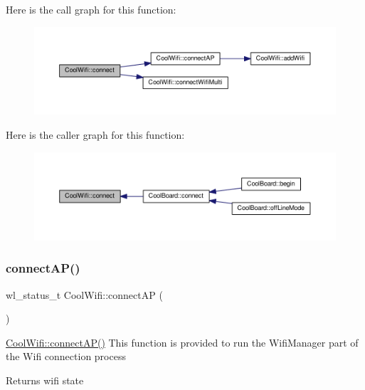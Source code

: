 Here is the call graph for this function\+:
\nopagebreak
\begin{figure}[H]
\begin{center}
\leavevmode
\includegraphics[width=350pt]{classCoolWifi_ad060353050f40d032a2dbf9e54a768bf_cgraph}
\end{center}
\end{figure}
Here is the caller graph for this function\+:
\nopagebreak
\begin{figure}[H]
\begin{center}
\leavevmode
\includegraphics[width=350pt]{classCoolWifi_ad060353050f40d032a2dbf9e54a768bf_icgraph}
\end{center}
\end{figure}
\mbox{\label{classCoolWifi_a7c857f27161782f5ef1d62d552aff971}} 
\subsubsection{\texorpdfstring{connect\+A\+P()}{connectAP()}}
{\footnotesize\ttfamily wl\+\_\+status\+\_\+t Cool\+Wifi\+::connect\+AP (\begin{DoxyParamCaption}{ }\end{DoxyParamCaption})}

\hyperlink{classCoolWifi_a7c857f27161782f5ef1d62d552aff971}{Cool\+Wifi\+::connect\+A\+P()} This function is provided to run the Wifi\+Manager part of the Wifi connection process

\begin{DoxyReturn}{Returns}
wifi state 
\end{DoxyReturn}


